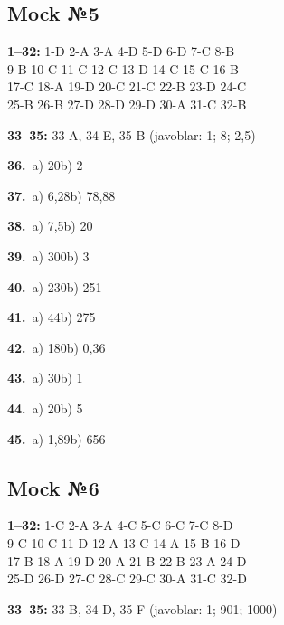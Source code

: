 \documentclass[11pt,a4paper]{article}
\begin{document}
\subsection*{Mock №5}
\noindent\textbf{1–32:} 1-D 2-A 3-A 4-D 5-D 6-D 7-C 8-B\\ 9-B 10-C 11-C 12-C 13-D 14-C 15-C 16-B\\ 17-C 18-A 19-D 20-C 21-C 22-B 23-D 24-C\\ 25-B 26-B 27-D 28-D 29-D 30-A 31-C 32-B\par
\noindent\textbf{33–35:} 33-A, 34-E, 35-B \quad (javoblar: 1; 8; 2,5)\par
\noindent\textbf{36.}\ a) 20\quad b) 2\par
\noindent\textbf{37.}\ a) 6,28\quad b) 78,88\par
\noindent\textbf{38.}\ a) 7,5\quad b) 20\par
\noindent\textbf{39.}\ a) 300\quad b) 3\par
\noindent\textbf{40.}\ a) 230\quad b) 251\par
\noindent\textbf{41.}\ a) 44\quad b) 275\par
\noindent\textbf{42.}\ a) 180\quad b) 0,36\par
\noindent\textbf{43.}\ a) 30\quad b) 1\par
\noindent\textbf{44.}\ a) 20\quad b) 5\par
\noindent\textbf{45.}\ a) 1,89\quad b) 656\par
{}\par\bigskip
{}\subsection*{Mock №6}
\noindent\textbf{1–32:} 1-C 2-A 3-A 4-C 5-C 6-C 7-C 8-D\\ 9-C 10-C 11-D 12-A 13-C 14-A 15-B 16-D\\ 17-B 18-A 19-D 20-A 21-B 22-B 23-A 24-D\\ 25-D 26-D 27-C 28-C 29-C 30-A 31-C 32-D\par
\noindent\textbf{33–35:} 33-B, 34-D, 35-F \quad (javoblar: 1; 901; 1000)\par
\end{document}
